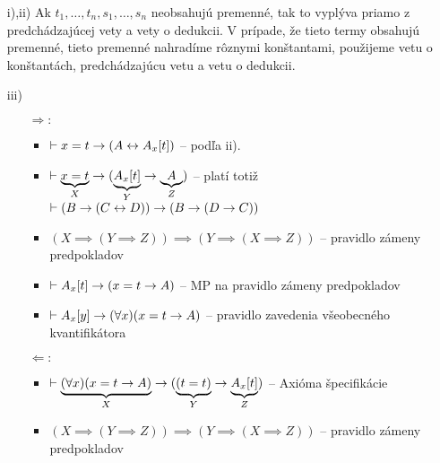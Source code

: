 \begin{dokaz}
    \noindent
    \begin{itemize}
        \item[i),ii)] Ak $t_1,\dots,t_n,s_1,\dots,s_n$ neobsahujú
            premenné, tak to vyplýva priamo z predchádzajúcej vety a vety
            o dedukcii. V prípade, že tieto termy obsahujú premenné,
            tieto premenné nahradíme rôznymi konštantami, použijeme
            vetu o konštantách, predchádzajúcu vetu a vetu o dedukcii.
        \item[iii)]
            \begin{itemize}
            \item[$\Rightarrow:$]
                \begin{itemize}
                \item $\vdash x=t \rightarrow (A \leftrightarrow
                    A_x[t])$ -- podľa ii).
                \item $\vdash \underbrace{x=t}_X \rightarrow (
                    \underbrace{A_x[t]}_Y \rightarrow
                    \underbrace{A}_Z)$ -- platí totiž
                    $\vdash (B \rightarrow (C \leftrightarrow D))
                    \rightarrow (B \rightarrow (D \rightarrow C))$
                \item $(X \implies (Y \implies Z)) \implies
                       (Y \implies (X \implies Z))$ -- pravidlo zámeny
                       predpokladov
                \item $\vdash A_x[t] \rightarrow (x=t \rightarrow A)$ --
                    MP na pravidlo zámeny predpokladov
                \item $\vdash A_x[y] \rightarrow (\forall x)(x=t
                    \rightarrow A)$ -- pravidlo zavedenia všeobecného
                    kvantifikátora
                \end{itemize}

            \item[$\Leftarrow:$]
                \begin{itemize}
                \item $\vdash \underbrace{(\forall x)(x=t \rightarrow
                    A)}_X \rightarrow
                        (\underbrace{(t=t)}_Y \rightarrow
                        \underbrace{A_x[t]}_Z)$ -- Axióma špecifikácie

                \item $(X \implies (Y \implies Z)) \implies
                       (Y \implies (X \implies Z))$ -- pravidlo zámeny
                       predpokladov


\end{itemize}
\end{itemize}
\end{itemize}
\end{dokaz}
